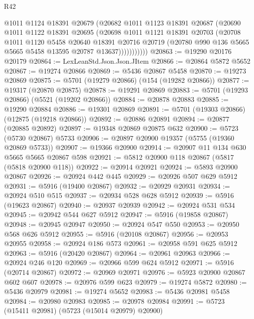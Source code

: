 \begin{lexlean}{R42}
\begin{coremodule}
                @1011
                @1124
                @18391
                @20679
                (@20682
                  @1011
                  @1123
                  @18391
                  @20687
                  (@20690
                    @1011
                    @1122
                    @18391
                    @20695
                    (@20698
                      @1011
                      @1121
                      @18391
                      @20703
                      (@20708
                        @1011
                        @1120
                        @5458
                        @20640
                        @18391
                        @20716
                        @20719
                        (@20780 @990 @136 @5665 @5665 @5458 @13595 @20787 @13637)))))))))))
@20863 := @19290 @20176 @20179
@20864 := LexLeanStd.Json.Json.JItem
@20866 := @20864 @5872 @5652
@20867 := @19274 @20866
@20869 := @5436 @20867 @5458
@20870 := @19273 @20869
@20875 := @5701 (@19279 @20866) (@154 (@19282 @20866))
@20877 := @19317 (@20870 @20875)
@20878 := @19291 @20869
@20883 := @5701 (@19293 @20866) (@5521 (@19202 @20866))
@20884 := @20878 @20883
@20885 := @19290 @20884
@20886 := @19301 @20869
@20891 := @5701 (@19303 @20866) (@12875 (@19218 @20866))
@20892 := @20886 @20891
@20894 := @20877 (@20885 @20892)
@20897 := @19348 @20869 @20875 @632
@20900 := @5723 (@5730 @20867) @5733
@20906 := @20897 @20900 @19357 (@5755 (@19360 @20869 @5733))
@20907 := @19366 @20900
@20914 := @20907 @11 @134 @630 @5665 @5665 @20867 @598
@20921 := @5812 @20900 @118 @20867 (@5817 (@5818 @20900 @118))
@20922 := @20914 @20921
@20924 := @5893 @20900 @20867
@20926 := @20924 @442 @445
@20929 := @20926 @507 @629 @5912
@20931 := @5916 (@19400 @20867)
@20932 := @20929 @20931
@20934 := @20924 @510 @515
@20937 := @20934 @528 @628 @5912
@20939 := @5916 (@19623 @20867)
@20940 := @20937 @20939
@20942 := @20924 @531 @534
@20945 := @20942 @544 @627 @5912
@20947 := @5916 (@19858 @20867)
@20948 := @20945 @20947
@20950 := @20924 @547 @550
@20953 := @20950 @568 @626 @5912
@20955 := @5916 (@20108 @20867)
@20956 := @20953 @20955
@20958 := @20924 @186 @573
@20961 := @20958 @591 @625 @5912
@20963 := @5916 (@20420 @20867)
@20964 := @20961 @20963
@20966 := @20924 @246 @120
@20969 := @20966 @599 @624 @5912
@20971 := @5916 (@20714 @20867)
@20972 := @20969 @20971
@20976 := @5923 @20900 @20867 @602 @607
@20978 := @20976 @599 @623
@20979 := @19274 @5872
@20980 := @5436 @20979
@20981 := @19274 @5652
@20983 := @5436 @20981 @5458
@20984 := @20980 @20983
@20985 := @20978 @20984
@20991 := @5723 (@15411 @20981) (@5723 (@15014 @20979) @20900)

\end{coremodule}
\end{lexlean}

